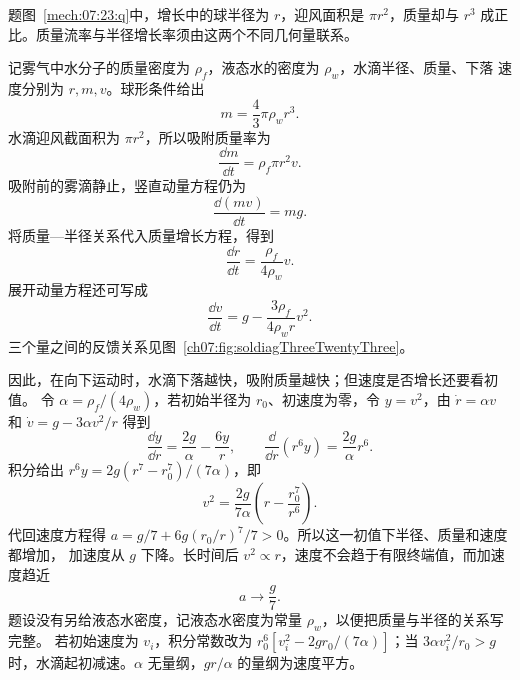 {\begin{origexamplebox}{}
\begin{qualityfigure}
\label{mech:07:23:q}
\end{qualityfigure}
\end{origexamplebox}

\begin{xesolution}题图~\ref{mech:07:23:q}中，增长中的球半径为 $r$，迎风面积是 $\pi r^2$，质量却与 $r^3$ 成正比。质量流率与半径增长率须由这两个不同几何量联系。

记雾气中水分子的质量密度为 $\rho_f$，液态水的密度为 $\rho_w$，水滴半径、质量、下落
速度分别为 $r,m,v$。球形条件给出
\[
 \boxed{m=\frac43\pi\rho_w r^3}.
\]
水滴迎风截面积为 $\pi r^2$，所以吸附质量率为
\[
 \boxed{\frac{\dd m}{\dd t}=\rho_f\pi r^2v}.
\]
吸附前的雾滴静止，竖直动量方程仍为
\[
 \boxed{\frac{\dd(mv)}{\dd t}=mg}.
\]
将质量—半径关系代入质量增长方程，得到
\[
 \boxed{\frac{\dd r}{\dd t}=\frac{\rho_f}{4\rho_w}v}.
\]
展开动量方程还可写成
\[
 \boxed{
 \frac{\dd v}{\dd t}
 =g-\frac{3\rho_f}{4\rho_w r}v^2}.
\]
三个量之间的反馈关系见图~\ref{ch07:fig:soldiagThreeTwentyThree}。

\soldiagThreeTwentyThree
因此，在向下运动时，水滴下落越快，吸附质量越快；但速度是否增长还要看初值。
令 $\alpha=\rho_f/(4\rho_w)$，若初始半径为 $r_0$、初速度为零，令 $y=v^2$，由
$\dot r=\alpha v$ 和 $\dot v=g-3\alpha v^2/r$ 得到
\[
 \frac{\dd y}{\dd r}=\frac{2g}{\alpha}-\frac{6y}{r},\qquad
 \frac{\dd}{\dd r}(r^6y)=\frac{2g}{\alpha}r^6.
\]
积分给出 $r^6y=2g(r^7-r_0^7)/(7\alpha)$，即
\[
 v^2=\frac{2g}{7\alpha}\left(r-\frac{r_0^7}{r^6}\right).
\]
代回速度方程得 $a=g/7+6g(r_0/r)^7/7>0$。所以这一初值下半径、质量和速度都增加，
加速度从 $g$ 下降。长时间后 $v^2\propto r$，速度不会趋于有限终端值，而加速度趋近
\[
 \boxed{a\to\frac{g}{7}}.
\]
题设没有另给液态水密度，记液态水密度为常量 $\rho_w$，以便把质量与半径的关系写完整。
若初始速度为 $v_i$，积分常数改为 $r_0^6[v_i^2-2gr_0/(7\alpha)]$；当
$3\alpha v_i^2/r_0>g$ 时，水滴起初减速。$\alpha$ 无量纲，$gr/\alpha$ 的量纲为速度平方。
\end{xesolution}
}

